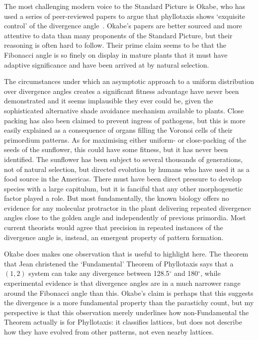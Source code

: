 The most challenging modern voice to the Standard Picture is Okabe, who has used a series of peer-reviewed papers to argue that phyllotaxis shows `exquisite control' of the divergence angle~\autocite{okabeRiddlePhyllotaxisExquisite2016}. Okabe's papers are better sourced and more attentive to data than many proponents of the Standard Picture, but their reasoning is often hard to follow. Their prime claim seems to be that the Fibonacci angle is so finely on display in mature plants that it must have adaptive significance and have been arrived at by natural selection. 

The circumstances under which an asymptotic approach to a uniform distribution over divergence angles creates a significant fitness advantage have never been demonstrated and it seems implausible they ever could be, given the sophisticated alternative shade avoidance mechanism available to plants. Close packing has also been claimed to prevent ingress of pathogens, but this is more easily explained as a consequence of organs filling the Voronoi cells of their primordium patterns. As for maximising either uniform- or close-packing of the seeds of the sunflower, this could have some fitness, but it has never been identified. The sunflower has been subject to several thousands of generations, not of natural selection, but directed evolution by humans who have used it as a food source in the Americas. There must have been direct pressure to develop species with a large capitulum, but it is fanciful that any other morphogenetic factor played a role. 
But most fundamentally, the known biology offers no evidence for any molecular protractor in the plant delivering repeated divergence angles close to the golden angle and independently of previous primordia. Most current theorists would agree that precision in repeated instances of the divergence angle is, instead, an emergent property of pattern formation. 

Okabe does makes one observation that is useful to highlight here. The theorem that Jean christened the `Fundamental' Theorem of Phyllotaxis says that a $(1,2)$ system can take any divergence between 128.5$^\circ$ and 180$^\circ$, while experimental evidence is that divergence angles are in a much narrower range around the Fibonacci angle than this. Okabe's claim is perhaps that this suggests the divergence is a more fundamental property than the parastichy count, but my perspective is that this observation merely underlines how non-Fundamental the Theorem actually is for Phyllotaxis: it classifies lattices, but does not describe how they have evolved from other patterns, not even nearby lattices. 

